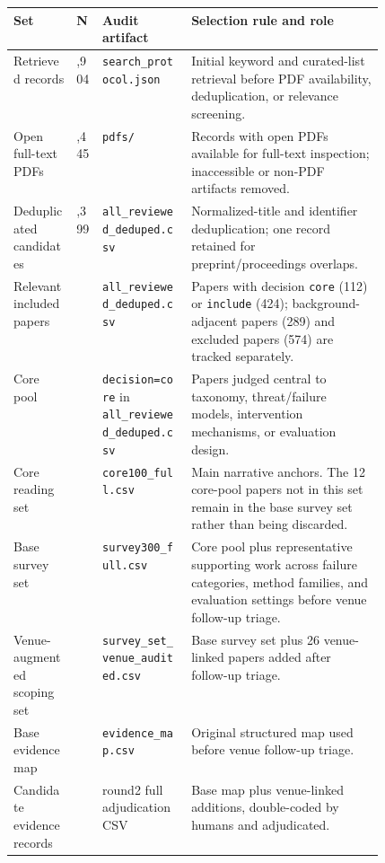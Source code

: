 \documentclass[11pt]{article}
\begin{document}

\begin{table}[t]
\centering
\scriptsize
\renewcommand{\arraystretch}{0.92}
\begin{tabularx}{\linewidth}{>{\raggedright\arraybackslash}p{0.17\linewidth}>{\raggedleft\arraybackslash}p{0.07\linewidth}>{\raggedright\arraybackslash}p{0.24\linewidth}X}
\toprule
\textbf{Set} & \textbf{N} & \textbf{Audit artifact} & \textbf{Selection rule and role} \\
\midrule
Retrieved records & 1,904 & \texttt{search\_protocol.json} & Initial keyword and curated-list retrieval before PDF availability, deduplication, or relevance screening. \\
Open full-text PDFs & 1,445 & \texttt{pdfs/} & Records with open PDFs available for full-text inspection; inaccessible or non-PDF artifacts removed. \\
Deduplicated candidates & 1,399 & \texttt{all\_reviewed\_deduped.csv} & Normalized-title and identifier deduplication; one record retained for preprint/proceedings overlaps. \\
Relevant included papers & 536 & \texttt{all\_reviewed\_deduped.csv} & Papers with decision \texttt{core} (112) or \texttt{include} (424); background-adjacent papers (289) and excluded papers (574) are tracked separately. \\
Core pool & 112 & \texttt{decision=core} in \texttt{all\_reviewed\_deduped.csv} & Papers judged central to taxonomy, threat/failure models, intervention mechanisms, or evaluation design. \\
Core reading set & 100 & \texttt{core100\_full.csv} & Main narrative anchors. The 12 core-pool papers not in this set remain in the base survey set rather than being discarded. \\
Base survey set & 300 & \texttt{survey300\_full.csv} & Core pool plus representative supporting work across failure categories, method families, and evaluation settings before venue follow-up triage. \\
Venue-augmented scoping set & 326 & \texttt{survey\_set\_venue\_audited.csv} & Base survey set plus 26 venue-linked papers added after follow-up triage. \\
Base evidence map & 250 & \texttt{evidence\_map.csv} & Original structured map used before venue follow-up triage. \\
Candidate evidence records & 274 & round2 full adjudication CSV & Base map plus venue-linked additions, double-coded by humans and adjudicated. \\

\end{tabularx}
\end{table}
\end{document}
